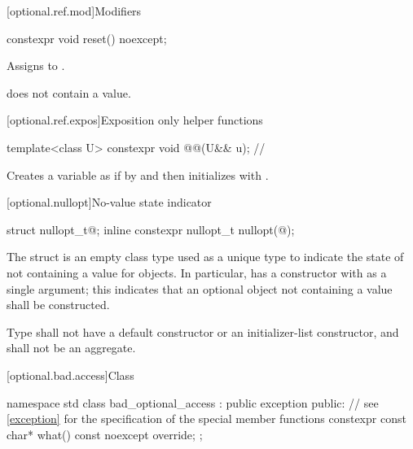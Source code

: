 [optional.ref.mod]{Modifiers}

\begin{itemdecl}
constexpr void reset() noexcept;
\end{itemdecl}

\begin{itemdescr}
\pnum
\effects
Assigns  to .

\pnum
\ensures
{} does not contain a value.
\end{itemdescr}

[optional.ref.expos]{Exposition only helper functions}

\begin{itemdecl}
template<class U>
  constexpr void @@(U&& u);  // \expos
\end{itemdecl}

\begin{itemdescr}
\pnum
\effects
Creates a variable  as if by 
and then initializes  with .
\end{itemdescr}

[optional.nullopt]{No-value state indicator}

%
%
\begin{itemdecl}
struct nullopt_t{@\seebelow@};
inline constexpr nullopt_t nullopt(@\unspec@);
\end{itemdecl}

\pnum
The struct  is an empty class type used as a unique type to indicate the state of not containing a value for  objects.
In particular,  has a constructor with  as a single argument;
this indicates that an optional object not containing a value shall be constructed.

\pnum
Type  shall not have a default constructor or an initializer-list constructor, and shall not be an aggregate.

[optional.bad.access]{Class }

\begin{codeblock}
namespace std {
  class bad_optional_access : public exception {
  public:
    // see \ref{exception} for the specification of the special member functions
    constexpr const char* what() const noexcept override;
  };
}
\end{codeblock}

